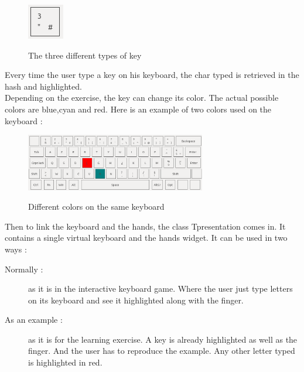 \begin{figure}[H]
\begin{minipage}[b]{0.10\textwidth}
    \label{key-two-chars}
  \end{minipage}
    \begin{minipage}[b]{0.10\textwidth}
    \includegraphics[width=\textwidth]{images/key-three-chars.png}
    \label{key-three-chars}
  \end{minipage}
  \caption{The three different types of key}
\end{figure}

Every time the user type a key on his keyboard, the char typed is retrieved in the hash and highlighted.\\
Depending on the exercise, the key can change its color. The actual possible colors are blue,cyan and red. Here is an example of two colors used on the keyboard : 
\begin{figure}[H]
	\centering
	\includegraphics[width=0.7\textwidth]{images/wrong-key.png}
	\label{wrong-key}
	\caption{Different colors on the same keyboard}
\end{figure}

Then to link the keyboard and the hands, the class Tpresentation comes in. It contains a single virtual keyboard and the hands widget.
It can be used in two ways :
\begin{description}
	 \item[Normally :] as it is in the interactive keyboard game. Where the user just type letters on its keyboard and see it highlighted along with the finger.
	 \item[As an example :] as it is for the learning exercise. A key is already highlighted as well as the finger. And the user has to reproduce the example. Any other letter typed is highlighted in red.
\end{description}

